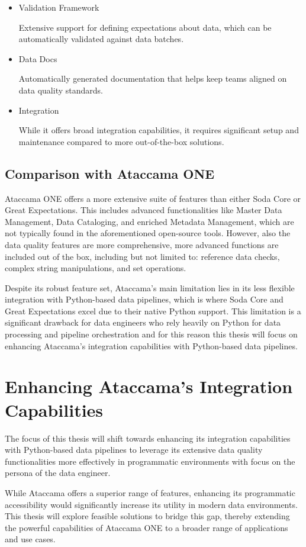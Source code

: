 \begin{itemize}
    \item   Validation Framework
    
    Extensive support for defining expectations about data, which can be automatically validated against data batches.

    \item Data Docs
    
    Automatically generated documentation that helps keep teams aligned on data quality standards.

    \item Integration
    
    While it offers broad integration capabilities, it requires significant setup and maintenance compared to more out-of-the-box solutions.
\end{itemize}


\subsection{Comparison with Ataccama ONE}

Ataccama ONE offers a more extensive suite of features than either Soda Core or Great Expectations. This includes advanced functionalities like Master Data Management, Data Cataloging, and enriched Metadata Management, which are not typically found in the aforementioned open-source tools. However, also the data quality features are more comprehensive, more advanced functions are included out of the box, including but not limited to: reference data checks, complex string manipulations, and set operations.

Despite its robust feature set, Ataccama’s main limitation lies in its less flexible integration with Python-based data pipelines, which is where Soda Core and Great Expectations excel due to their native Python support. This limitation is a significant drawback for data engineers who rely heavily on Python for data processing and pipeline orchestration and for this reason this thesis will focus on enhancing Ataccama's integration capabilities with Python-based data pipelines.

\section{Enhancing Ataccama's Integration Capabilities}

The focus of this thesis will shift towards enhancing its integration capabilities with Python-based data pipelines to leverage its extensive data quality functionalities more effectively in programmatic environments with focus on the persona of the data engineer.

While Ataccama offers a superior range of features, enhancing its programmatic accessibility would significantly increase its utility in modern data environments. This thesis will explore feasible solutions to bridge this gap, thereby extending the powerful capabilities of Ataccama ONE to a broader range of applications and use cases.
